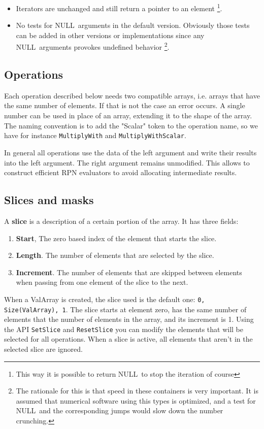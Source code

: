 \documentclass[12pt,a4paper]{memoir} %
\newif\iftth
\newcommand{\Null}{{\iftth \ NULL \else \footnotesize NULL\  \fi}}
\begin{document}
{{\begin{itemize}
types are to be written to the disk: they contain surely no pointers that need to be followed. Their signature is changed.
\item Iterators are unchanged and still return a pointer to an element \footnote{This way it is possible to return \Null to stop the iteration of course}.
\item No tests for \Null arguments in the default version. 
Obviously those tests can be added in other versions or implementations since any \Null arguments
provokes undefined behavior \footnote{The rationale for this is that speed in these containers is very important. It is assumed that numerical software 
using this types is optimized, and a test for \Null and the corresponding jumps would slow down the number crunching.}.
\end{itemize}
\subsection{Operations}
Each operation described below needs two compatible arrays, i.e. arrays that have the same number of elements. If that is not the case an error
occurs. A single number can be used in place of an array, extending it to the shape of the array. The naming convention is to add the "Scalar" token
to the operation name, so we have for instance \texttt{MultiplyWith} and \texttt{MultiplyWithScalar}.

In general all operations use the data of the left argument and write their results into the left argument. The right argument remains unmodified.
This allows to construct efficient RPN evaluators to avoid allocating intermediate results.
\subsection{Slices and masks}
A \textbf{slice} is a description of a certain portion of the array. It has three fields:
\begin{enumerate}
\item \textbf{Start}, The zero based index of the element that starts the slice.
\item \textbf{Length}. The number of elements that are selected by the slice.
\item \textbf{Increment}. The number of elements that are skipped between elements when passing from one element of the slice to the next.
\end{enumerate}
When a ValArray is created, the slice used is the default one: \texttt{0, Size(ValArray), 1}. The slice starts at element zero,
has the same number of elements that the number of elements in the array, and its increment is 1. Using the API \texttt{SetSlice} and
\texttt{ResetSlice} you can modify the elements that will be selected for all operations. When a slice is active, all elements that aren't in the
selected slice are ignored.

}}
\end{document}
